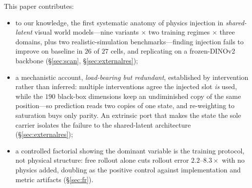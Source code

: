 This paper contributes:
\begin{itemize}
    \item to our knowledge, the first systematic anatomy of physics injection in \emph{shared-latent} visual world models---nine variants $\times$ two training regimes $\times$ three domains, plus two realistic-simulation benchmarks---finding injection fails to improve on baseline in $26$ of $27$ cells, and replicating on a frozen-DINOv2 backbone (\S\ref{sec:scan}, \S\ref{sec:externalres});
    \item a mechanistic account, \emph{load-bearing but redundant}, established by intervention rather than inferred: multiple interventions agree the injected slot \emph{is} used, while the $190$ black-box dimensions keep an undiminished copy of the same position---so prediction reads two copies of one state, and re-weighting to saturation buys only parity. An extrinsic port that makes the state the sole carrier isolates the failure to the shared-latent architecture (\S\ref{sec:externalres});
    \item a controlled factorial showing the dominant variable is the training protocol, not physical structure: free rollout alone cuts rollout error $2.2$--$8.3\times$ with no physics added, doubling as the positive control against implementation and metric artifacts (\S\ref{sec:fr}).
\end{itemize}
